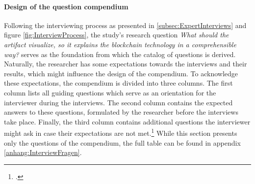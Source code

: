\paragraph{Design of the question compendium} Following the interviewing process as presented in \ref{subsec:ExpertInterviews} and figure \ref{fig:InterviewProcess}, the study's research question \textit{What should the artifact visualize, so it explains the blockchain technology in a comprehensible way?} serves as the foundation from which the catalog of questions is derived. Naturally, the researcher has some expectations towards the interviews and their results, which might influence the design of the compendium. To acknowledge these expectations, the compendium is divided into three columns. The first column lists all guiding questions which serve as an orientation for the interviewer during the interviews. The second column contains the expected answers to these questions, formulated by the researcher before the interviews take place. Finally, the third column contains additional questions the interviewer might ask in case their expectations are not met.\footcite[Cf.][p.431]{AghamanoukjanQualitativeInterviews2007} While this section presents only the questions of the compendium, the full table can be found in appendix \ref{anhang:InterviewFragen}.


